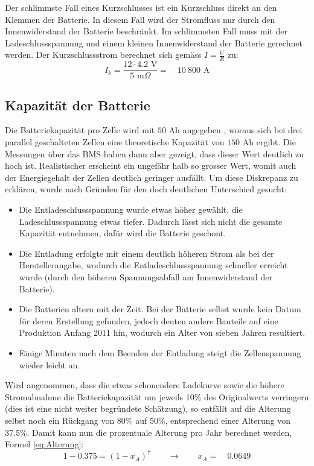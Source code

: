 Der schlimmste Fall eines Kurzschlusses ist ein Kurzschluss direkt an den Klemmen der Batterie. In diesem Fall wird der Stromfluss nur durch den Innenwiderstand der Batterie beschränkt. Im schlimmsten Fall muss mit der Ladeschlussspannung und einem kleinen Innenwiderstand der Batterie gerechnet werden. Der Kurzschlussstrom berechnet sich gemäss $I=\frac{U}{R}$ zu:
\begin{equation*}
	I_k=\frac{12\cdot 4.2\text{ V}}{5\text{ m}\Omega}=\quad\underline{10\ 800\text{ A}}
\end{equation*}

\subsection{Kapazität der Batterie}\label{sec:ah}
Die Batteriekapazität pro Zelle wird mit $50$ Ah angegeben \cite{lev50}, woraus sich bei drei parallel geschalteten Zellen eine theoretische Kapazität von $150$ Ah ergibt. Die Messungen über das BMS haben dann aber gezeigt, dass dieser Wert deutlich zu hoch ist. Realistischer erscheint ein ungefähr halb so grosser Wert, womit auch der Energiegehalt der Zellen deutlich geringer ausfällt. Um diese Diskrepanz zu erklären, wurde nach Gründen für den doch deutlichen Unterschied gesucht: \begin{itemize}
	\item Die Entladeschlussspannung wurde etwas höher gewählt, die Ladeschlussspannung etwas tiefer. Dadurch lässt sich nicht die gesamte Kapazität entnehmen, dafür wird die Batterie geschont.
	\item Die Entladung erfolgte mit einem deutlich höheren Strom als bei der Herstellerangabe, wodurch die Entladeschlussspannung schneller erreicht wurde (durch den höheren Spannungsabfall am Innenwiderstand der Batterie).
	\item Die Batterien altern mit der Zeit. Bei der Batterie selbst wurde kein Datum für deren Erstellung gefunden, jedoch deuten andere Bauteile auf eine Produktion Anfang 2011 hin, wodurch ein Alter von sieben Jahren resultiert.
	\item Einige Minuten nach dem Beenden der Entladung steigt die Zellenspannung wieder leicht an.
\end{itemize}

Wird angenommen, dass die etwas schonendere Ladekurve sowie die höhere Stromabnahme die Batteriekapazität um jeweils 10\% des Originalwerts verringern (dies ist eine nicht weiter begründete Schätzung), so entfällt auf die Alterung selbst noch ein Rückgang von 80\% auf 50\%, entsprechend einer Alterung von 37.5\%. Damit kann nun die prozentuale Alterung pro Jahr berechnet werden, Formel \ref{eq:Alterung}:
\begin{equation}
	1-0.375=\left(1-x_A\right)^7\qquad\rightarrow\qquad x_A=\quad\underline{0.0649}
\label{eq:Alterung}
\end{equation}

